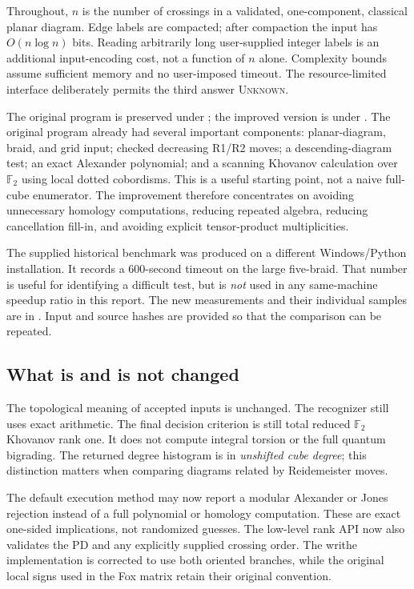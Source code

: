 \documentclass[11pt,letterpaper]{article}
\theoremstyle{definition}\newtheorem{definition}[theorem]{Definition}
\theoremstyle{remark}\newtheorem{remark}[theorem]{Remark}
\newcommand{\F}{\mathbb F}
\newcommand{\code}[1]{\texttt{\detokenize{#1}}}
\newcommand{\UNKNOWN}{\textsc{Unknown}}
\begin{document}
Throughout, $n$ is the number of crossings in a validated, one-component,
classical planar diagram. Edge labels are compacted; after compaction the input
has $O(n\log n)$ bits. Reading arbitrarily long user-supplied integer labels is
an additional input-encoding cost, not a function of $n$ alone. Complexity bounds
assume sufficient memory and no user-imposed timeout. The resource-limited
interface deliberately permits the third answer \UNKNOWN.

The original program is preserved under \code{baseline/}; the improved version
is under \code{fast/}. The original program already had several important
components: planar-diagram, braid, and grid input; checked decreasing R1/R2
moves; a descending-diagram test; an exact Alexander polynomial; and a scanning
Khovanov calculation over $\F_2$ using local dotted cobordisms. This is a useful
starting point, not a naive full-cube enumerator. The improvement therefore
concentrates on avoiding unnecessary homology computations, reducing repeated
algebra, reducing cancellation fill-in, and avoiding explicit tensor-product
multiplicities.

The supplied historical benchmark was produced on a different Windows/Python
installation. It records a 600-second timeout on the large five-braid. That
number is useful for identifying a difficult test, but is \emph{not} used in any
same-machine speedup ratio in this report. The new measurements and their
individual samples are in \code{results/benchmark.json}. Input and source hashes
are provided so that the comparison can be repeated.

\subsection{What is and is not changed}

The topological meaning of accepted inputs is unchanged. The recognizer still
uses exact arithmetic. The final decision criterion is still total reduced
$\F_2$ Khovanov rank one. It does not compute integral torsion or the full quantum
bigrading. The returned degree histogram is in \emph{unshifted cube degree};
this distinction matters when comparing diagrams related by Reidemeister moves.

The default execution method may now report a modular Alexander or Jones
rejection instead of a full polynomial or homology computation. These are exact
one-sided implications, not randomized guesses. The low-level rank API now also
validates the PD and any explicitly supplied crossing order. The writhe
implementation is corrected to use both oriented branches, while the original
local signs used in the Fox matrix retain their original convention.
\end{document}
